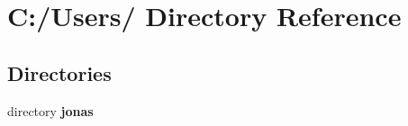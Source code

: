 \section{C:/Users/ Directory Reference}
\label{dir_C_3A_2FUsers_2F}


\subsection*{Directories}
\begin{CompactItemize}
\item 
directory {\bf jonas}
\end{CompactItemize}
